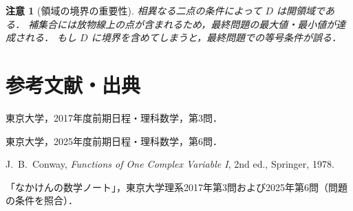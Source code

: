\documentclass[a5paper,10pt,onecolumn]{jsarticle}
\theoremstyle{mathnotetheorem}
\newtheorem{remark}[theorem]{注意}
\begin{document}
\begin{remark}[領域の境界の重要性]
相異なる二点の条件によって $D$ は開領域である．
補集合には放物線上の点が含まれるため，最終問題の最大値・最小値が達成される．
もし $D$ に境界を含めてしまうと，最終問題での等号条件が誤る．
\end{remark}

\section*{参考文献・出典}
\begin{enumerate}[label={[\arabic*]}]
\item 東京大学，2017年度前期日程・理科数学，第3問．
\item 東京大学，2025年度前期日程・理科数学，第6問．
\item J.~B.~Conway, \textit{Functions of One Complex Variable I}, 2nd ed., Springer, 1978.
\item 「なかけんの数学ノート」，東京大学理系2017年第3問および2025年第6問（問題の条件を照合）．
\end{enumerate}
\end{document}
